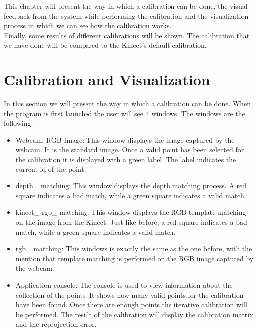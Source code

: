 \noindent
This chapter will present the way in which a calibration can be done, the visual feedback from the system while performing the calibration and the visualization process in which we can see how the calibration works.
\\
Finally, some results of different calibrations will be shown. The calibration that we have done will be compared to the Kinect's default calibration. 

\section{Calibration and Visualization}
In this section we will present the way in which a calibration can be done. When the program is first launched the user will see 4 windows. The windows are the following:
\begin{itemize}
	\item Webcam: RGB Image: This window displays the image captured by the webcam. It is the standard image. Once a valid point has been selected for the calibration it is displayed with a green label. The label indicates the current id of the point.  
	\item depth\_ matching: This window displays the depth matching process. A red square indicates a bad match, while a green square indicates a valid match.
	\item kinect\_ rgb\_ matching: This window displays the RGB template matching on the image from the Kinect. Just like before, a red square indicates a bad match, while a green square indicates a valid match. 
	\item rgb\_ matching: This windows is exactly the same as the one before, with the mention that template matching is performed on the RGB image captured by the webcam. 
	\item Application console: The console is used to view information about the collection of the points. It shows how many valid points for the calibration have been found. Once there are enough points the iterative calibration will be performed. The result of the calibration will display the calibration matrix and the reprojection error. 
\end{itemize}

